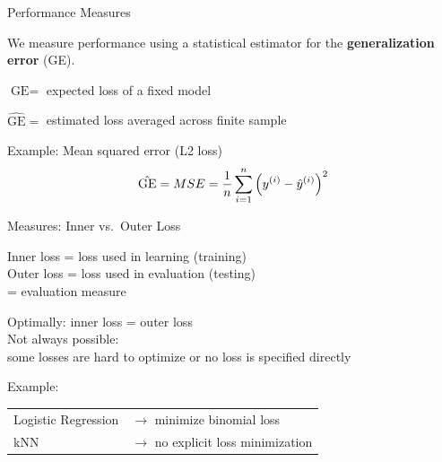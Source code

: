    \begin{frame}[c]{Performance Measures}

    We measure performance using a statistical estimator for the 
    \textbf{generalization error} (GE).

    $\text{GE} = $ expected loss of a fixed model

    $\hat{\text{GE}} = $ estimated loss averaged across finite sample

    Example: Mean squared error (L2 loss)
    \[
        \hat{\text{GE}} = MSE = \frac{1}{n} \sum_{i=1}^n \left(y^{(i)} - \hat{y}^{(i)}\right)^2
    \]

    \end{frame}

    \begin{frame}[c]{Measures: Inner vs.\ Outer Loss}

    \begin{center}
        Inner loss = loss used in learning (training)\\
        Outer loss = loss used in evaluation (testing)\\
            = evaluation measure
    \end{center}

    Optimally: inner loss = outer loss\\[.5em]
    Not always possible:\\ some losses are hard to optimize or no loss is specified directly\\
    
    \bigskip

    Example:\\[.5em]
    \begin{tabular}{ll}
    Logistic Regression & $\rightarrow$ minimize binomial loss \\
    kNN & $\rightarrow$ no explicit loss minimization\\
    \end{tabular}

    \end{frame}

